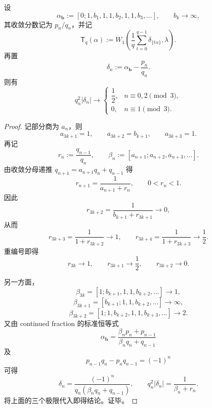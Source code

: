 \begin{theorem}[稀疏爆破模板的分母逼近普适律]\label{thm:conclusion-kronecker-sparse-blowup-universal-denominator-law}
设
\[
\alpha_{\mathbf b}:=[0;1,b_1,1,1,b_2,1,1,b_3,\ldots],
\qquad
b_k\to\infty,
\]
其收敛分数记为 \(p_n/q_n\)，并记
\[
\mathsf T_q(\alpha):=W_1\!\left(\frac1q\sum_{t=0}^{q-1}\delta_{\{t\alpha\}},\lambda\right).
\]
再置
\[
\delta_n:=\alpha_{\mathbf b}-\frac{p_n}{q_n}.
\]
则有
\[
q_n^2\left|\delta_n\right|
\longrightarrow
\begin{cases}
\dfrac12,& n\equiv 0,2 \pmod 3,\\[4pt]
0,& n\equiv 1 \pmod 3.
\end{cases}
\]
\end{theorem}
\begin{proof}
记部分商为 \(a_n\)，则
\[
a_{3k+1}=1,\qquad a_{3k+2}=b_{k+1},\qquad a_{3k+3}=1.
\]
再记
\[
r_n:=\frac{q_{n-1}}{q_n},
\qquad
\beta_n:=[a_{n+1};a_{n+2},a_{n+3},\ldots].
\]
由收敛分母递推 \(q_{n+1}=a_{n+1}q_n+q_{n-1}\) 得
\[
r_{n+1}=\frac1{a_{n+1}+r_n},
\qquad
0<r_n<1.
\]
因此
\[
r_{3k+2}=\frac1{b_{k+1}+r_{3k+1}}\to0,
\]
从而
\[
r_{3k+3}=\frac1{1+r_{3k+2}}\to1,
\qquad
r_{3k+4}=\frac1{1+r_{3k+3}}\to\frac12.
\]
重编号即得
\[
r_{3k}\to1,\qquad r_{3k+1}\to\frac12,\qquad r_{3k+2}\to0.
\]

另一方面，
\[
\beta_{3k}=[1;b_{k+1},1,1,b_{k+2},\ldots]\to1,
\]
\[
\beta_{3k+1}=[b_{k+1};1,1,b_{k+2},\ldots]\to\infty,
\]
\[
\beta_{3k+2}=[1;1,b_{k+2},1,1,b_{k+3},\ldots]\to2.
\]
又由 continued fraction 的标准恒等式
\[
\alpha_{\mathbf b}
=
\frac{\beta_n p_n+p_{n-1}}{\beta_n q_n+q_{n-1}}
\]
及
\[
p_{n-1}q_n-p_nq_{n-1}=(-1)^n
\]
可得
\[
\delta_n
=
\frac{(-1)^n}{q_n(\beta_n q_n+q_{n-1})},
\qquad
q_n^2|\delta_n|=\frac1{\beta_n+r_n}.
\]
将上面的三个极限代入即得结论。证毕。
\end{proof}

